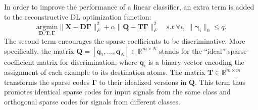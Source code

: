 \documentclass[journal]{IEEEtran}
\newcommand{\bD}{\mathbf{D}}
\newcommand{\bq}{\mathbf{q}}
\newcommand{\bX}{\mathbf{X}}
\newcommand{\bT}{\mathbf{T}}
\newcommand{\bQ}{\mathbf{Q}}
\newcommand{\bGamma}{\boldsymbol{\Gamma}}
\newcommand{\bgamma}{\boldsymbol{\gamma}}
\begin{document}
In order to improve the performance of a linear classifier, an extra term is added to the reconstructive DL optimization function:
\begin{equation}\label{eq:LC-KSVD1}
\underset{\bD,\bT,\bGamma}{\text{argmin}} \|\bX - \bD \bGamma\|_F^2
  + \alpha \|\bQ - \bT \bGamma\|_F^2 \quad s.t \ \forall i, \, \|\bgamma_i\|_0 \leq q.
\end{equation}
The second term encourages the sparse coefficients to be discriminative. More specifically, the matrix $\bQ=[\bq_1,\ldots,\bq_N] \in \mathbb{R}^{m \times N}$ stands for the ``ideal'' sparse-coefficient matrix for discrimination, where $\bq_{i}$ is a binary vector encoding the assignment of each example to its destination atoms. The matrix $\bT \in \mathbb{R}^{m \times m}$ transforms the sparse codes $\bGamma$ to their idealized versions in $\bQ$. This term thus promotes identical sparse codes for input signals from the same class and orthogonal sparse codes for signals from different classes.

\end{document}
